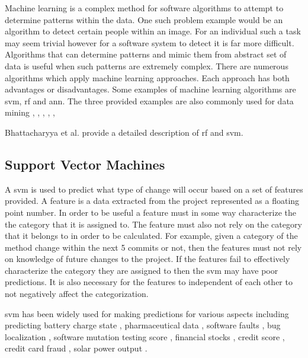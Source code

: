 Machine learning is a complex method for software algorithms to attempt to determine patterns within the data. One such problem example would be an algorithm to detect certain people within an image. For an individual such a task may seem trivial however for a software system to detect it is far more difficult. Algorithms that can determine patterns and mimic them from abstract set of data is useful when such patterns are extremely complex. There are numerous algorithms which apply machine learning approaches. Each approach has both advantages or disadvantages. Some examples of machine learning algorithms are \gls{svm}, \gls{rf} and \gls{ann}. The three provided examples are also commonly used for data mining \cite{Alam2013}, \cite{Granitto2007}, \cite{Westland2011}, \cite{Yu2011}, \cite{Huang2007}, \cite{Jalbert2012} %

Bhattacharyya et al. provide a detailed description of \gls{rf} and \gls{svm}.

\subsection{Support Vector Machines}
\label{subsec:svm_prediction}


A \gls{svm} is used to predict what type of change will occur based on a set of features provided. A feature is a data extracted from the project represented as a floating point number. In order to be useful a feature must in some way characterize the the category that it is assigned to. The feature must also not rely on the category that it belongs to in order to be calculated. For example, given a category of the method change within the next 5 commits or not, then the features must not rely on knowledge of future changes to the project. If the features fail to effectively characterize the category they are assigned to then the \gls{svm} may have poor predictions. It is also necessary for the features to independent of each other to not negatively affect the categorization.


\gls{svm} has been widely used for making predictions for various aspects including predicting battery charge state \cite{Anton2013}, pharmaceutical data \cite{Burbidge2001}, software faults \cite{Gondra2008, Erturk2015, Malhotra2015, Kim2008, Moeyersoms2015, Neuhaus2007}, bug localization \cite{Murphy2007, Neuhaus2007}, software mutation testing score \cite{Jalbert2012}, financial stocks \cite{Kim2003}, credit score \cite{Huang2007}, credit card fraud \cite{Westland2011}, solar power output \cite{Zeng2016}.



